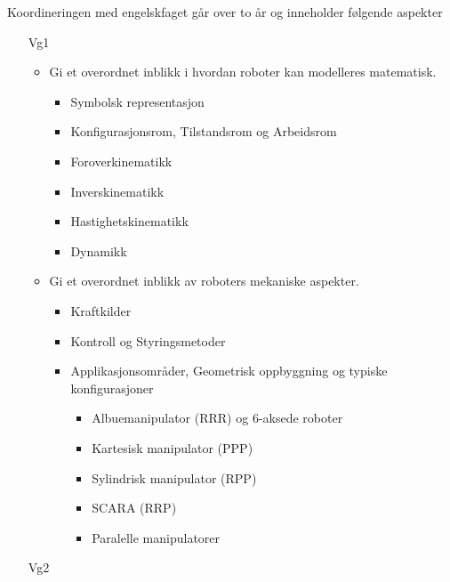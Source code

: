 	Koordineringen med engelskfaget går over to år og inneholder følgende aspekter

		\begin{itemize}

			\item[Vg1] \begin{itemize}

							\item Gi et overordnet inblikk i hvordan roboter kan modelleres matematisk.

								\begin{itemize}
									\item Symbolsk representasjon
									\item Konfigurasjonsrom, Tilstandsrom og Arbeidsrom
									\item Foroverkinematikk
									\item Inverskinematikk
									\item Hastighetskinematikk
									\item Dynamikk
								\end{itemize}

							\item Gi et overordnet inblikk av roboters mekaniske aspekter.

								\begin{itemize}
									\item Kraftkilder
									\item Kontroll og Styringsmetoder
									\item Applikasjonsområder, Geometrisk oppbyggning og typiske konfigurasjoner

										\begin{itemize}
											\item Albuemanipulator (RRR) og 6-aksede roboter
											\item Kartesisk manipulator (PPP)
											\item Sylindrisk manipulator (RPP)
											\item SCARA (RRP)
											\item Paralelle manipulatorer
										\end{itemize}

								\end{itemize}

						\end{itemize}

			\item[Vg2] \begin{itemize}


\end{itemize}
\end{itemize}
